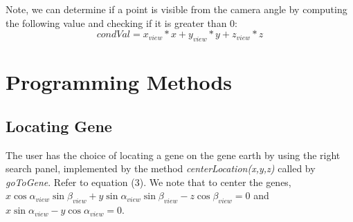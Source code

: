 \documentclass[]{article}
\begin{document}
Note, we can determine if a point is visible from the camera angle by computing the following value and checking if it is greater than 0: 
$$condVal = x_{view} * x + y_{view} * y + z_{view} * z $$


\section{Programming Methods}
\subsection{Locating Gene}

The user has the choice of locating a gene on the gene earth by using the right search panel, implemented by the method \textit{centerLocation(x,y,z)} called by \textit{goToGene}. Refer to equation (3). We note that to center the genes, $x\cos \alpha_{view} \sin \beta_{view} + y\sin \alpha_{view} \sin \beta_{view} -z\cos \beta_{view}=0$ and $x \sin \alpha_{view} -y\cos \alpha_{view} = 0$. 
\end{document}
